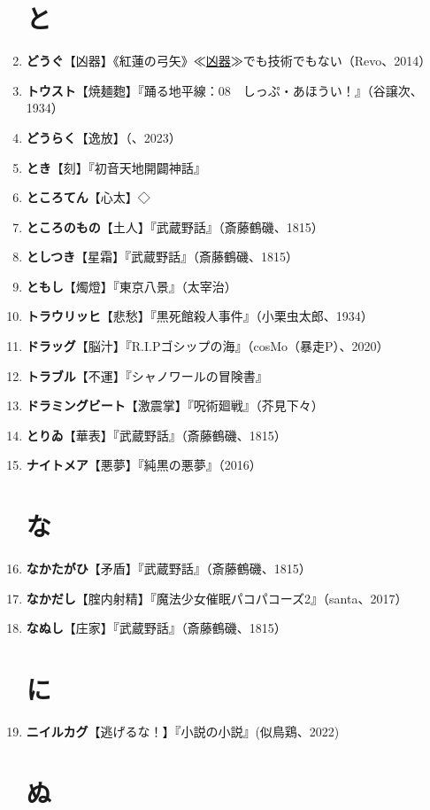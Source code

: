 \documentclass[twocolumn]{jsbook}
\newcommand{\ccite}[1]{《#1》}
\begin{document}
\begin{enumerate}
\section*{と}
    \item \textbf{どうぐ}【凶器】\ccite{紅蓮の弓矢}{≪\uline{凶器}≫でも技術でもない（Revo、2014）}
    \item \textbf{トウスト}【焼麺麭】『踊る地平線：08　しっぷ・あほうい！』（谷譲次、1934）
    \item \textbf{どうらく}【逸放】（、2023）
    \item \textbf{とき}【刻】『初音天地開闢神話』
    \item \textbf{ところてん}【心太】◇
    \item \textbf{ところのもの}【土人】『武蔵野話』（斎藤鶴磯、1815）
    \item \textbf{としつき}【星霜】『武蔵野話』（斎藤鶴磯、1815）
    \item \textbf{ともし}【燭燈】『東京八景』（太宰治）
    \item \textbf{トラウリッヒ}【悲愁】『黒死館殺人事件』（小栗虫太郎、1934）
    \item \textbf{ドラッグ}【脳汁】『R.I.Pゴシップの海』（cosMo（暴走P）、2020）
    \item \textbf{トラブル}【不運】『シャノワールの冒険書』
    \item \textbf{ドラミングビート}【激震掌】『呪術廻戦』（芥見下々）
    \item \textbf{とりゐ}【華表】『武蔵野話』（斎藤鶴磯、1815）
    \item \textbf{ナイトメア}【悪夢】『純黒の悪夢』（2016）
\section*{な}
    \item \textbf{なかたがひ}【矛盾】『武蔵野話』（斎藤鶴磯、1815）
    \item \textbf{なかだし}【腟内射精】『魔法少女催眠パコパコーズ2』（santa、2017）
    \item \textbf{なぬし}【庄家】『武蔵野話』（斎藤鶴磯、1815）
\section*{に}
    \item \textbf{ニイルカグ}【逃げるな！】『小説の小説』(似鳥鶏、2022)
\section*{ぬ}

\end{enumerate}
\end{document}
